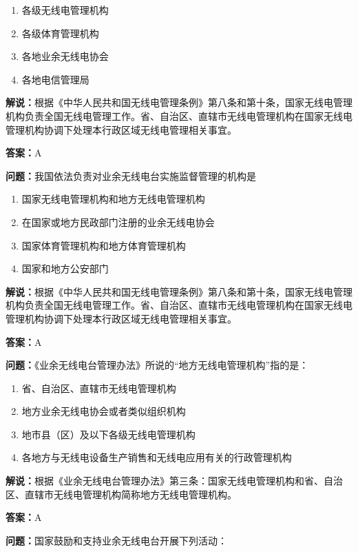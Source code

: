 \documentclass[UTF8]{ctexbook}
\begin{document}
\begin{enumerate}[label=\Alph*), leftmargin=3em]
  \item 各级无线电管理机构
  \item 各级体育管理机构
  \item 各地业余无线电协会
  \item 各地电信管理局
\end{enumerate}

\textbf{解说：}根据《中华人民共和国无线电管理条例》第八条和第十条，国家无线电管理机构负责全国无线电管理工作。省、自治区、直辖市无线电管理机构在国家无线电管理机构协调下处理本行政区域无线电管理相关事宜。

\textbf{答案：}A

\textbf{问题：}我国依法负责对业余无线电台实施监督管理的机构是

\begin{enumerate}[label=\Alph*), leftmargin=3em]
  \item 国家无线电管理机构和地方无线电管理机构
  \item 在国家或地方民政部门注册的业余无线电协会
  \item 国家体育管理机构和地方体育管理机构
  \item 国家和地方公安部门
\end{enumerate}

\textbf{解说：}根据《中华人民共和国无线电管理条例》第八条和第十条，国家无线电管理机构负责全国无线电管理工作。省、自治区、直辖市无线电管理机构在国家无线电管理机构协调下处理本行政区域无线电管理相关事宜。

\textbf{答案：}A

\textbf{问题：}《业余无线电台管理办法》所说的“地方无线电管理机构”指的是：

\begin{enumerate}[label=\Alph*), leftmargin=3em]
  \item 省、自治区、直辖市无线电管理机构
  \item 地方业余无线电协会或者类似组织机构
  \item 地市县（区）及以下各级无线电管理机构
  \item 各地方与无线电设备生产销售和无线电应用有关的行政管理机构
\end{enumerate}
\textbf{解说：}根据《业余无线电台管理办法》第三条：国家无线电管理机构和省、自治区、直辖市无线电管理机构简称地方无线电管理机构。

\textbf{答案：}A

\textbf{问题：}国家鼓励和支持业余无线电台开展下列活动：
\end{document}
